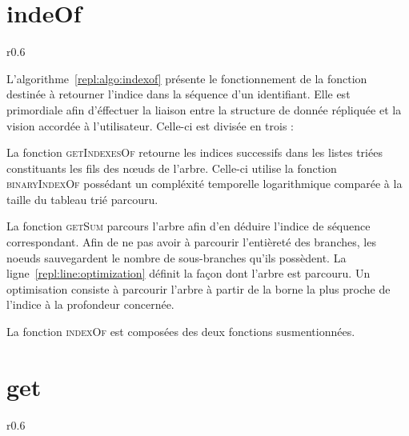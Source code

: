 \clearpage 

\section{indeOf}

\begin{wrapfigure}{r}{0.6\textwidth}
  \vspace{-35pt} %
  \begin{minipage}[t]{0.6\textwidth}
    \begin{algorithm}[H]
      
      \caption{\label{repl:algo:indexof} indexOf.}
    \end{algorithm}
  \end{minipage}
  \vspace{-15pt}
\end{wrapfigure}

L'algorithme~\ref{repl:algo:indexof} présente le fonctionnement de la fonction
destinée à retourner l'indice dans la séquence d'un identifiant. Elle est
primordiale afin d'éffectuer la liaison entre la structure de donnée répliquée
et la vision accordée à l'utilisateur. Celle-ci est divisée en trois :
\begin{inparaenum}[(i)]
\item La fonction \textsc{getIndexesOf} retourne les indices successifs dans les
  listes triées constituants les fils des nœuds de l'arbre. Celle-ci utilise la
  fonction \textsc{binaryIndexOf} possédant un compléxité temporelle
  logarithmique comparée à la taille du tableau trié parcouru.
\item La fonction \textsc{getSum} parcours l'arbre afin d'en déduire l'indice de
  séquence correspondant. Afin de ne pas avoir à parcourir l'entièreté des
  branches, les noeuds sauvegardent le nombre de sous-branches qu'ils possèdent.
  La ligne~\ref{repl:line:optimization} définit la façon dont l'arbre est
  parcouru. Un optimisation consiste à parcourir l'arbre à partir de la borne la
  plus proche de l'indice à la profondeur concernée.
\item La fonction \textsc{indexOf} est composées des deux fonctions
  susmentionnées.
\end{inparaenum}

\clearpage

\section{get}

\begin{wrapfigure}{r}{0.6\textwidth}
  \vspace{-35pt} %
  \begin{minipage}[t]{0.6\textwidth}
    \begin{algorithm}[H]
      
      \caption{\label{repl:algo:get} get.}
    \end{algorithm}
  \end{minipage}
  \vspace{-15pt}
\end{wrapfigure}
